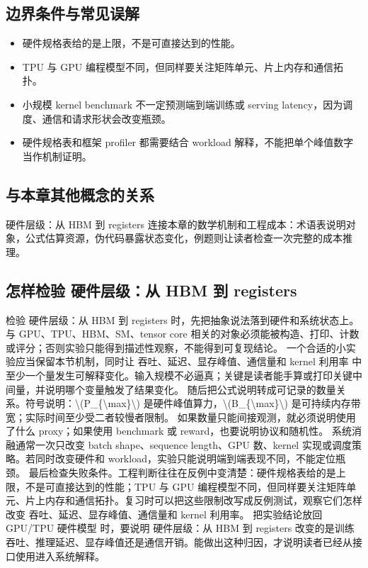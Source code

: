\documentclass[a4paper]{article}
\begin{document}
\subsection{边界条件与常见误解}
\begin{itemize}
\item 硬件规格表给的是上限，不是可直接达到的性能。
\item TPU 与 GPU 编程模型不同，但同样要关注矩阵单元、片上内存和通信拓扑。
\item 小规模 kernel benchmark 不一定预测端到端训练或 serving latency，因为调度、通信和请求形状会改变瓶颈。
\item 硬件规格表和框架 profiler 都需要结合 workload 解释，不能把单个峰值数字当作机制证明。
\end{itemize}
\subsection{与本章其他概念的关系}
硬件层级：从 HBM 到 registers 连接本章的数学机制和工程成本：术语表说明对象，公式估算资源，伪代码暴露状态变化，例题则让读者检查一次完整的成本推理。
\subsection{怎样检验 硬件层级：从 HBM 到 registers}
检验 硬件层级：从 HBM 到 registers 时，先把抽象说法落到硬件和系统状态上。与 GPU、TPU、HBM、SM、tensor core 相关的对象必须能被构造、打印、计数或评分；否则实验只能得到描述性观察，不能得到可复现结论。
一个合适的小实验应当保留本节机制，同时让 吞吐、延迟、显存峰值、通信量和 kernel 利用率 中至少一个量发生可解释变化。输入规模不必逼真；关键是读者能手算或打印关键中间量，并说明哪个变量触发了结果变化。
随后把公式说明转成可记录的数量关系。符号说明：\textbackslash{}(P\_\{\textbackslash{}max\}\textbackslash{}) 是硬件峰值算力，\textbackslash{}(B\_\{\textbackslash{}max\}\textbackslash{}) 是可持续内存带宽；实际时间至少受二者较慢者限制。 如果数量只能间接观测，就必须说明使用了什么 proxy；如果使用 benchmark 或 reward，也要说明协议和随机性。
系统消融通常一次只改变 batch shape、sequence length、GPU 数、kernel 实现或调度策略。若同时改变硬件和 workload，实验只能说明端到端表现不同，不能定位瓶颈。
最后检查失败条件。工程判断往往在反例中变清楚：硬件规格表给的是上限，不是可直接达到的性能；TPU 与 GPU 编程模型不同，但同样要关注矩阵单元、片上内存和通信拓扑。复习时可以把这些限制改写成反例测试，观察它们怎样改变 吞吐、延迟、显存峰值、通信量和 kernel 利用率。
把实验结论放回 GPU/TPU 硬件模型 时，要说明 硬件层级：从 HBM 到 registers 改变的是训练吞吐、推理延迟、显存峰值还是通信开销。能做出这种归因，才说明读者已经从接口使用进入系统解释。
\end{document}
